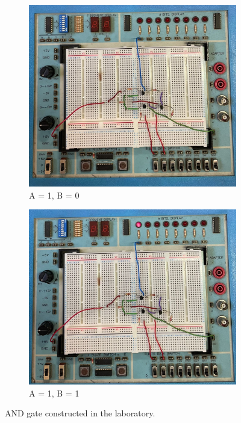 \begin{figure}[H]
        \vspace{1cm} %

        \begin{subfigure}{0.45\textwidth}
            \centering
            \includegraphics[width=\linewidth]{figures/photos/AND/10.png}
            \caption{A = 1, B = 0}
        \end{subfigure}
        \hfill
        \begin{subfigure}{0.45\textwidth}
            \centering
            \includegraphics[width=\linewidth]{figures/photos/AND/11.png}
            \caption{A = 1, B = 1}
        \end{subfigure}

        \caption{AND gate constructed in the laboratory.}
        \label{fig:AND_photos}
    \end{figure}

